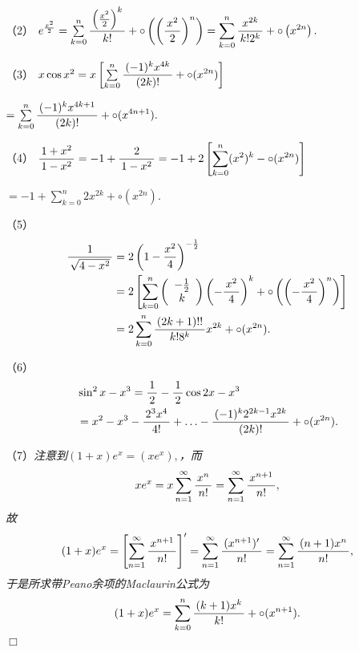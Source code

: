 \begin{frame}
	\linespread{1.5}
	
	
	\small （2）
	$
		e^{\frac{x^2}2}
		=\sum\limits_{k=0}^n\displaystyle\frac{\,{\left(\frac{x^2}2\right)^k}\,}{\,{k!}\,}
		+\circ\left(\left(\displaystyle\frac{\,{x^2}\,}{\,{2}\,}\right)^n\right)
		=\sum\limits_{k=0}^n\displaystyle\frac{\,{x^{2k}}\,}{\,{k!2^k}\,}
		+\circ\left(x^{2n}\right).
	$
	\bigskip
	
	\pause
	（3）
	$
		x\cos x^2
		=x\left[\sum\limits_{k=0}^n\displaystyle\frac{\,{(-1)^kx^{4k}}\,}{\,{(2k)!}\,}
		+\circ(x^{2n})\right]$
		
		\quad $
		=\sum\limits_{k=0}^n\displaystyle\frac{\,{(-1)^kx^{4k+1}}\,}{\,{(2k)!}\,}
		+\circ(x^{4n+1}).
	$
	\bigskip
	
	\pause
	（4）
	$
		\displaystyle\frac{\,{1+x^2}\,}{\,{1-x^2}\,}
		=-1+\displaystyle\frac{\,{2}\,}{\,{1-x^2}\,}
		=-1+2\left[\sum\limits_{k=0}^n(x^2)^k-\circ(x^{2n})\right]$
		
		\quad$
		=-1+\sum\limits_{k=0}^n2x^{2k}+\circ(x^{2n}).
	$
\end{frame}

\begin{frame}
	\linespread{1.5}
	
	
	\small （5）
	\begin{align*}
		\displaystyle\frac{\,{1}\,}{\,{\sqrt{4-x^2}}\,}
		&=2\left(1-\frac{x^2}4\right)^{-\frac12}\\
		&=2\left[\sum\limits_{k=0}^n\left(\begin{array}{c}
			-\frac12 \\ k
		\end{array}\right)\left(-\displaystyle\frac{\,{x^2}\,}{\,{4}\,}\right)^k
		+\circ\left(\left(-\displaystyle\frac{\,{x^2}\,}{\,{4}\,}\right)^n\right)
		\right]\\
		&=2\sum\limits_{k=0}^n\displaystyle\frac{\,{(2k+1)!!}\,}{\,{k!8^k}\,}x^{2k}
		+\circ(x^{2n}).
	\end{align*}
	
	\pause
	（6）
	\begin{align*}
		&\sin^2x-x^3=\displaystyle\frac{\,{1}\,}{\,{2}\,}-\displaystyle\frac{\,{1}\,}{\,{2}\,}\cos2x-x^3\\
		&=x^2-x^3-\displaystyle\frac{\,{2^3x^4}\,}{\,{4!}\,}
		+\ldots-\displaystyle\frac{\,{(-1)^k2^{2k-1}x^{2k}}\,}{\,{(2k)!}\,}+\circ(x^{2n}).
	\end{align*}
\end{frame}

\begin{frame}
	\linespread{1.5}
	
	
	\small （7）\it 注意到$(1+x)e^x=(xe^x),$，而
	$$xe^x=x\sum\limits_{n=1}^{\infty}\displaystyle\frac{\,{x^n}\,}{\,{n!}\,}=\sum\limits_{n=1}^{\infty}\displaystyle\frac{\,{x^{n+1}}\,}{\,{n!}\,},$$
	故
	$$(1+x)e^x=\left[\sum\limits_{n=1}^{\infty}\displaystyle\frac{\,{x^{n+1}}\,}{\,{n!}\,}\right]'
	=\sum\limits_{n=1}^{\infty}\displaystyle\frac{\,{(x^{n+1})'}\,}{\,{n!}\,}
	=\sum\limits_{n=1}^{\infty}\displaystyle\frac{\,{(n+1)x^n}\,}{\,{n!}\,},$$
	于是所求带Peano余项的Maclaurin公式为
	$$(1+x)e^x=\sum\limits_{k=0}^n\displaystyle\frac{\,{(k+1)x^k}\,}{\,{k!}\,}+\circ(x^{n+1}).$$
	\hfill$\Box$
\end{frame}